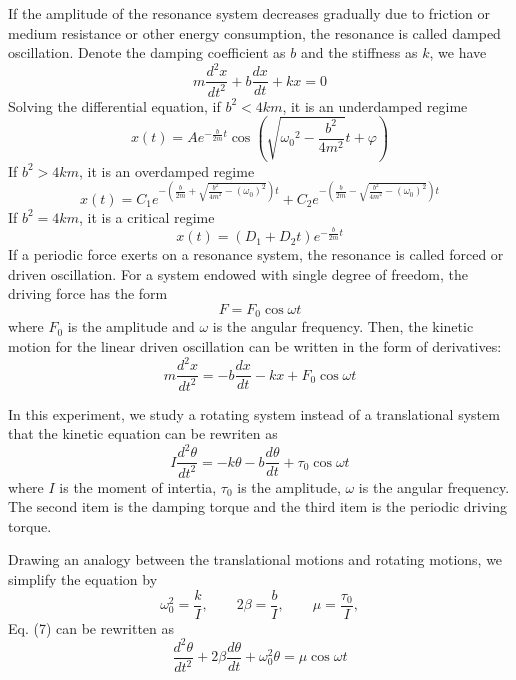 \documentclass[a4paper]{report}
\begin{document}
	If the amplitude of the resonance system decreases gradually due to friction or medium resistance or other energy consumption, the resonance is called damped oscillation. Denote the damping coefficient as $b$ and the stiffness as $k$, we have
	\begin{equation}
	m\dfrac{d^2x}{dt^2}+b\dfrac{dx}{dt}+kx=0
	\end{equation}
	Solving the differential equation, if $b^2<4km$, it is an underdamped regime
	\begin{equation}
	x(t)=Ae^{-\frac{b}{2m}t}\cos{(\sqrt{{\omega_0}^2-\dfrac{b^2}{4m^2}}t+\varphi)}
	\end{equation}
	If $b^2>4km$, it is an overdamped regime
	\begin{equation}
	x(t)=C_1e^{-(\frac{b}{2m}+\sqrt{\frac{b^2}{4m^2}-(\omega_0)^2})t}+C_2e^{-(\frac{b}{2m}-\sqrt{\frac{b^2}{4m^2}-(\omega_0)^2})t}
	\end{equation}
	If $b^2=4km$, it is a critical regime
	\begin{equation}
	x(t)=(D_1+D_2t)e^{-\frac{b}{2m}t}
	\end{equation}
	If a periodic force exerts on a resonance system, the resonance is called forced or driven oscillation. For a system endowed with single degree of freedom, the driving force has the form
	\begin{equation}
	F=F_0\cos{\omega t}
	\end{equation}
	where $F_0$ is the amplitude and $\omega$ is the angular frequency. Then, the kinetic motion for the linear driven oscillation can be written in the form of derivatives:
	\begin{equation}
	m\frac{d^2x}{dt^2}=-b\frac{dx}{dt}-kx+F_0\cos{\omega t}
	\end{equation}
	
	In this experiment, we study a rotating system instead of a translational system that the kinetic equation can be rewriten as
	\begin{equation}
	I\frac{d^2\theta}{dt^2}=-k\theta -b\frac{d\theta}{dt}+\tau_0\cos{\omega t}
	\end{equation}
	where $I$ is the moment of intertia, $\tau_0$ is the amplitude, $\omega$ is the angular frequency. The second item is the damping torque and the third item is the periodic driving torque.
	
	Drawing an analogy between the translational motions and rotating motions, we simplify the equation by
	\begin{equation}
	\omega_0^2=\frac{k}{I},\qquad 2\beta=\frac{b}{I},\qquad \mu=\frac{\tau_0}{I},
	\end{equation}
	Eq. (7) can be rewritten as
	\begin{equation}
	\frac{d^2\theta}{dt^2}+2\beta\frac{d\theta}{dt}+\omega_0^2\theta=\mu\cos{\omega t}
	\end{equation}
	
\end{document}
